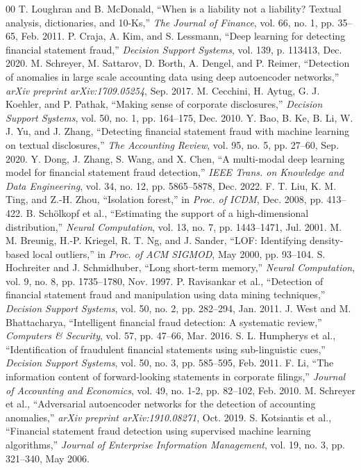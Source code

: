 \documentclass[conference]{IEEEtran}
\begin{document}

 
\begin{thebibliography}{00}
 T. Loughran and B. McDonald, ``When is a liability not a liability? Textual analysis, dictionaries, and 10-Ks,'' \textit{The Journal of Finance}, vol. 66, no. 1, pp. 35--65, Feb. 2011.
 P. Craja, A. Kim, and S. Lessmann, ``Deep learning for detecting financial statement fraud,'' \textit{Decision Support Systems}, vol. 139, p. 113413, Dec. 2020.
 M. Schreyer, M. Sattarov, D. Borth, A. Dengel, and P. Reimer, ``Detection of anomalies in large scale accounting data using deep autoencoder networks,'' \textit{arXiv preprint arXiv:1709.05254}, Sep. 2017.
 M. Cecchini, H. Aytug, G. J. Koehler, and P. Pathak, ``Making sense of corporate disclosures,'' \textit{Decision Support Systems}, vol. 50, no. 1, pp. 164--175, Dec. 2010.
 Y. Bao, B. Ke, B. Li, W. J. Yu, and J. Zhang, ``Detecting financial statement fraud with machine learning on textual disclosures,'' \textit{The Accounting Review}, vol. 95, no. 5, pp. 27--60, Sep. 2020.
 Y. Dong, J. Zhang, S. Wang, and X. Chen, ``A multi-modal deep learning model for financial statement fraud detection,'' \textit{IEEE Trans. on Knowledge and Data Engineering}, vol. 34, no. 12, pp. 5865--5878, Dec. 2022.
 F. T. Liu, K. M. Ting, and Z.-H. Zhou, ``Isolation forest,'' in \textit{Proc. of ICDM}, Dec. 2008, pp. 413--422.
 B. Schölkopf et al., ``Estimating the support of a high-dimensional distribution,'' \textit{Neural Computation}, vol. 13, no. 7, pp. 1443--1471, Jul. 2001.
 M. M. Breunig, H.-P. Kriegel, R. T. Ng, and J. Sander, ``LOF: Identifying density-based local outliers,'' in \textit{Proc. of ACM SIGMOD}, May 2000, pp. 93--104.
 S. Hochreiter and J. Schmidhuber, ``Long short-term memory,'' \textit{Neural Computation}, vol. 9, no. 8, pp. 1735--1780, Nov. 1997.
 P. Ravisankar et al., ``Detection of financial statement fraud and manipulation using data mining techniques,'' \textit{Decision Support Systems}, vol. 50, no. 2, pp. 282--294, Jan. 2011.
 J. West and M. Bhattacharya, ``Intelligent financial fraud detection: A systematic review,'' \textit{Computers \& Security}, vol. 57, pp. 47--66, Mar. 2016.
 S. L. Humpherys et al., ``Identification of fraudulent financial statements using sub-linguistic cues,'' \textit{Decision Support Systems}, vol. 50, no. 3, pp. 585--595, Feb. 2011.
 F. Li, ``The information content of forward-looking statements in corporate filings,'' \textit{Journal of Accounting and Economics}, vol. 49, no. 1-2, pp. 82--102, Feb. 2010.
 M. Schreyer et al., ``Adversarial autoencoder networks for the detection of accounting anomalies,'' \textit{arXiv preprint arXiv:1910.08271}, Oct. 2019.
 S. Kotsiantis et al., ``Financial statement fraud detection using supervised machine learning algorithms,'' \textit{Journal of Enterprise Information Management}, vol. 19, no. 3, pp. 321--340, May 2006.
\end{thebibliography}
\end{document}
